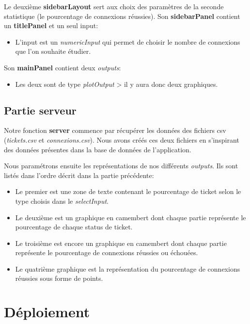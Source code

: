 \documentclass[12pt, a4paper]{article}
\begin{document}
Le deuxième \textbf{sidebarLayout} sert aux choix des paramètres de la seconde statistique (le pourcentage de connexions réussies).
Son \textbf{sidebarPanel} contient un \textbf{titlePanel} et un seul input:
\begin{itemize}
    \item L'input est un \textit{numericInput}  qui permet de choisir le nombre de connexions que l'on souhaite étudier.
\end{itemize}
Son \textbf{mainPanel} contient deux \textit{outputs}:
\begin{itemize}
    \item Les deux sont de type \textit{plotOutput} > il y aura donc deux graphiques.
\end{itemize}

\subsection*{Partie serveur}

Notre fonction \textbf{server} commence par récupérer les données des fichiers csv (\textit{tickets.csv} et \textit{connexions.csv}).
Nous avons créés ces deux fichiers en s'inspirant des données présentes dans la base de données de l'application.

\noindent Nous paramétrons ensuite les représentations de nos différents \textit{outputs}.
Ils sont listés dans l'ordre décrit dans la partie précédente:

\begin{itemize}
    \item Le premier est une zone de texte contenant le pourcentage de ticket selon le type choisis dans le \textit{selectInput}.
    \item Le deuxième est un graphique en camembert dont chaque partie représente le pourcentage de chaque status de ticket.
    \item Le troisième est encore un graphique en camembert dont chaque partie représente le pourcentage de connexions réussies ou échouées.
    \item Le quatrième graphique est la représentation du pourcentage de connexions réussies sous forme de points.
\end{itemize}

\section{Déploiement}
\end{document}
